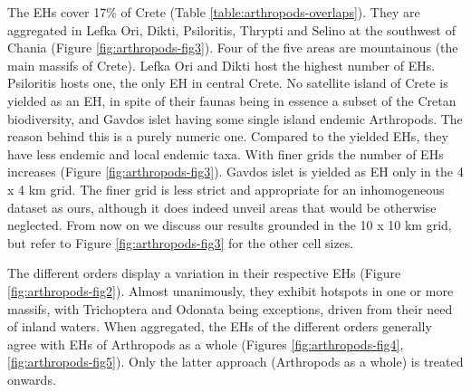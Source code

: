     The EHs cover 17\% of Crete (Table \ref{table:arthropods-overlaps}). They are aggregated in Lefka Ori, Dikti,
Psiloritis, Thrypti and Selino at the southwest of Chania (Figure \ref{fig:arthropods-fig3}).
Four of the five areas are mountainous (the main massifs of Crete). Lefka Ori
and Dikti host the highest number of EHs. Psiloritis hosts one, the only EH in
central Crete. No satellite island of Crete is yielded as an EH, in spite of
their faunas being in essence a subset of the Cretan biodiversity, and Gavdos
islet having some single island endemic Arthropods. The reason behind this is a
purely numeric one. Compared to the yielded EHs, they have less endemic and local
endemic taxa. With finer grids the number of EHs increases (Figure \ref{fig:arthropods-fig3}).
Gavdos islet is yielded as EH only in the 4 x 4 km grid. The finer grid is less strict
and appropriate for an inhomogeneous dataset as ours, although it does indeed
unveil areas that would be otherwise neglected. From now on we discuss our
results grounded in the 10 x 10 km grid, but refer to Figure \ref{fig:arthropods-fig3} for the other
cell sizes.

The different orders display a variation in their respective EHs (Figure \ref{fig:arthropods-fig2}).
Almost unanimously, they exhibit hotspots in one or more massifs,
with Trichoptera and Odonata being exceptions, driven from their need of inland waters.
When aggregated, the EHs of the different orders generally agree with EHs of
Arthropods as a whole (Figures \ref{fig:arthropods-fig4}, \ref{fig:arthropods-fig5}). Only the
latter approach (Arthropods as a whole) is treated onwards.

